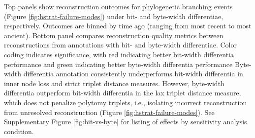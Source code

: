 \begin{figure*}
{   Top panels show reconstruction outcomes for phylogenetic branching events (Figure \ref{fig:hstrat-failure-modes}) under bit- and byte-width differentiae, respectively.
   Outcomes are binned by time ago (ranging from most recent to most ancient).
   Bottom panel compares reconstruction quality metrics between reconstructions from annotations with bit- and byte-width differentiae.
   Color coding indicates significance, with red indicating better bit-width differentia performance and green indicating better byte-width differentia performance
   Byte-width differentia annotation consistently underperforms bit-width differentia in inner node loss and strict triplet distance measures.
   However, byte-width differentia outperform bit-width differentia in the lax triplet distance measure, which does not penalize polytomy triplets, i.e., isolating incorrect reconstruction from unresolved reconstruction (Figure \ref{fig:hstrat-failure-modes}).
  See Supplementary Figure \ref{fig:bit-vs-byte} for listing of effects by sensitivity analysis condition.
}
  \label{fig:bit-vs-byte-summary}

\end{figure*}
